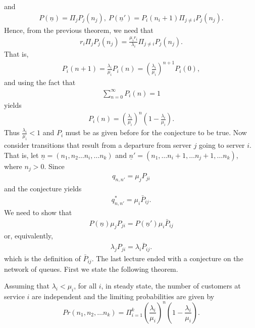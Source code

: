 \documentclass[a4paper,10pt,english]{article}
\begin{document}
 and 
 \begin{align*}
 P(\underline{n})=\Pi_j P_j(n_j),~ P(\underline{n}')=P_i(n_i+1)\Pi_{j \neq i}P_j(n_j).
 \end{align*}
 Hence, from the previous theorem, we need that
 \begin{align*}
  r_i \Pi_j P_j(n_j)= \frac{\mu_i r_i}{\lambda_i}\Pi_{j \neq i}P_j(n_j).
 \end{align*} 
 That is,
 \begin{align*}
 P_i(n+1)= \frac{\lambda_i}{\mu_i}P_i(n)={(\frac{\lambda_i}{\mu_i})}^{n+1}P_i(0),
 \end{align*}
 and using the fact that 
 \begin{align*}
\sum_{n=0}^{\infty}P_i(n)=1
 \end{align*}
 yields 
 \begin{align*}
P_i(n) ={(\frac{\lambda_i}{\mu_i})}^n(1-\frac{\lambda_i}{\mu_i}).
\end{align*}
Thus $\frac{\lambda_i}{\mu_i}< 1$ and $P_i$ must be as given before for the conjecture to be true. Now consider transitions that result from a departure from server $j$ going to server $i$. That is, let $\underline{n}=(n_1,n_2 \hdots n_i, \hdots n_k)$ and $\underline{n}'=(n_1,\hdots n_i+1,\hdots n_j+1,\hdots n_k)$, where $n_j >0$. Since
\begin{align*}
q_{n,n'}=\mu_j P_{ji}
\end{align*}
and the conjecture yields
\begin{align*}
q_{n,n'}^*=\mu_i \bar{P}_{ij}.
\end{align*}
We need to show that 
\begin{align*}
P(\underline{n})\mu_j P_{ji}= P(\underline{n}')\mu_i \bar{P}_{ij}
\end{align*}
or, equivalently,
\begin{align*}
\lambda_j P_{ji}=\lambda_i \bar{P}_{ij}.
\end{align*}
which is the definition of $\bar{P}_{ij}$.
The last lecture ended with a conjecture on the network of queues. First we state the following theorem.
\begin{thm}
Assuming that $\lambda_i < \mu_i$, for all $i$, in steady state, the number of customers at service $i$ are independent and the limiting probabilities are given by
\begin{equation*}
Pr(n_1,n_2, \hdots n_k) = \Pi_{i=1}^{k}{(\frac{\lambda_i}{\mu_i})}^n (1-\frac{\lambda_i}{\mu_i}).
\end{equation*}
\end{thm}
\end{document}

